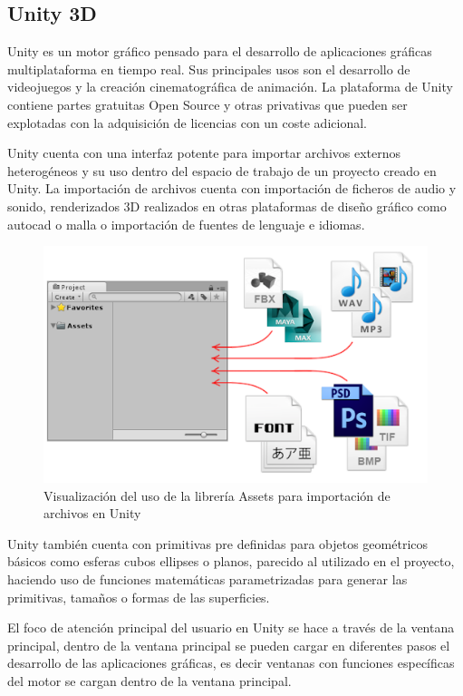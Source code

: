 \documentclass[a4paper, 17pt]{book}
\begin{document}
\subsection{Unity 3D} 
\label{subsec:Unity3D}

Unity es un motor gráfico pensado para el desarrollo de aplicaciones gráficas multiplataforma en tiempo
real. Sus principales usos son el desarrollo de videojuegos y la creación cinematográfica de animación.
La plataforma de Unity contiene partes gratuitas Open Source y otras privativas que pueden ser explotadas
con la adquisición de licencias con un coste adicional.

Unity cuenta con una interfaz potente para importar archivos externos heterogéneos y su uso dentro del
espacio de trabajo de un proyecto creado en Unity.  La importación de archivos cuenta con importación
de ficheros de audio y sonido, renderizados 3D realizados en otras plataformas de diseño gráfico como
autocad o malla o importación de fuentes de lenguaje e idiomas.

\begin{figure}[hbt!]
    \centering
    \includegraphics[scale=0.60, keepaspectratio]{img/unity_assets.png}
    \caption{Visualización del uso de la librería Assets para importación de archivos en Unity}
    \label{figura:unity_assets}
\end{figure}

Unity también cuenta con primitivas pre definidas para objetos geométricos básicos como esferas cubos
ellipses o planos, parecido al utilizado en el proyecto, haciendo uso de funciones matemáticas parametrizadas
para generar las primitivas, tamaños o formas de las superficies.

El foco de atención principal del usuario en Unity se hace a través de la ventana principal, dentro de
la ventana principal se pueden cargar en diferentes pasos el desarrollo de las aplicaciones gráficas,
es decir ventanas con funciones específicas del motor se cargan dentro de la ventana principal. 
\end{document}
